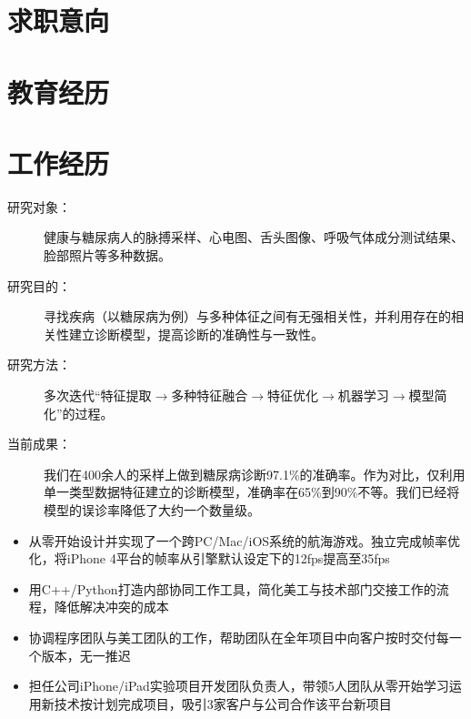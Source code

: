 \documentclass[10pt,a4paper]{moderncv/moderncv}
\begin{document}
\maketitle

\section{求职意向}

\section{教育经历}


\section{工作经历}
{
\begin{description}
	\item[研究对象：] 健康与糖尿病人的脉搏采样、心电图、舌头图像、呼吸气体成分测试结果、脸部照片等多种数据。
	\item[研究目的：] 寻找疾病（以糖尿病为例）与多种体征之间有无强相关性，并利用存在的相关性建立诊断模型，提高诊断的准确性与一致性。
	\item[研究方法：] 多次迭代``特征提取$\rightarrow$多种特征融合$\rightarrow$特征优化$\rightarrow$机器学习$\rightarrow$模型简化''的过程。
	\item[当前成果：] 我们在400余人的采样上做到糖尿病诊断97.1\%的准确率。作为对比，仅利用单一类型数据特征建立的诊断模型，准确率在65\%到90\%不等。我们已经将模型的误诊率降低了大约一个数量级。
\end{description}
}

{
\begin{itemize}
	\item 从零开始设计并实现了一个跨PC/Mac/iOS系统的航海游戏。独立完成帧率优化，将iPhone 4平台的帧率从引擎默认设定下的12fps提高至35fps
	\item 用C++/Python打造内部协同工作工具，简化美工与技术部门交接工作的流程，降低解决冲突的成本
	\item 协调程序团队与美工团队的工作，帮助团队在全年项目中向客户按时交付每一个版本，无一推迟
	\item 担任公司iPhone/iPad实验项目开发团队负责人，带领5人团队从零开始学习运用新技术按计划完成项目，吸引3家客户与公司合作该平台新项目
\end{itemize}
}
\end{document}
